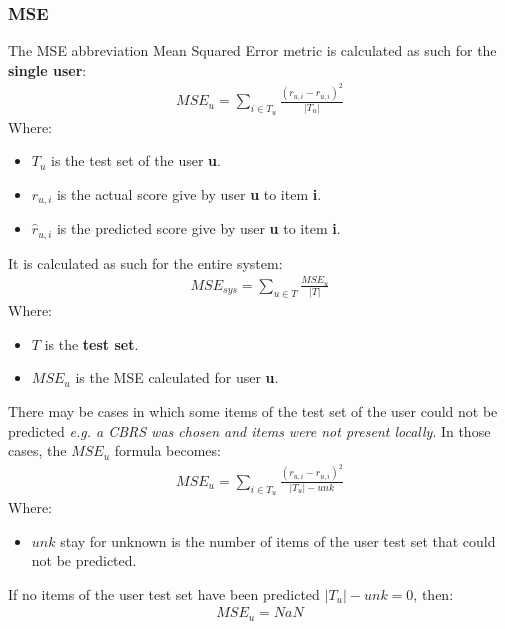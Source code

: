\documentclass[11pt]{article}
\begin{document}
\subsubsection{MSE}\label{subsubsec:mse}
The MSE abbreviation Mean Squared Error metric is calculated as such for the \textbf{single user}:
\hfill\break
\hfill\break
    \[
       \begin{gathered}
           MSE_u = \sum_{i \in T_u} \frac{(r_{u,i} - \hat{r}_{u,i})^2}{|T_u|}
       \end{gathered}
    \]
\hfill\break
\hfill\break
    Where:
\begin{itemize}
    \item $T_u$ is the test set of the user \textbf{u}.
    \item $r_{u, i}$ is the actual score give by user \textbf{u} to item \textbf{i}.
    \item $\hat{r}_{u, i}$ is the predicted score give by user \textbf{u} to item \textbf{i}.
\end{itemize}
\hfill\break
\hfill\break
It is calculated as such for the entire system:
\hfill\break
\hfill\break
    \[
       \begin{gathered}
           MSE_{sys} = \sum_{u \in T} \frac{MSE_u}{|T|}
       \end{gathered}
    \]
\hfill\break
\hfill\break
    Where:
\begin{itemize}
    \item $T$ is the \textbf{test set}.
    \item $MSE_u$ is the MSE calculated for user \textbf{u}.
\end{itemize}
\hfill\break
\hfill\break
There may be cases in which some items of the test set of the user could not be predicted
\textit{e.g. a CBRS was chosen and items were not present locally}.
In those cases, the $MSE_u$ formula becomes:
\hfill\break
\hfill\break
    \[
       \begin{gathered}
           MSE_u = \sum_{i \in T_u} \frac{(r_{u,i} - \hat{r}_{u,i})^2}{|T_u| - unk}
       \end{gathered}
    \]
\hfill\break
\hfill\break
    Where:
\begin{itemize}
    \item $unk$ stay for unknown is the number of items of the user test set that could not be predicted.
\end{itemize}
\hfill\break
\hfill\break
If no items of the user test set have been predicted $|T_u| - unk = 0$, then:
\hfill\break
\hfill\break
    \[
        \begin{gathered}
            MSE_u = NaN
        \end{gathered}
    \]
\hfill\break
\hfill\break
\end{document}
